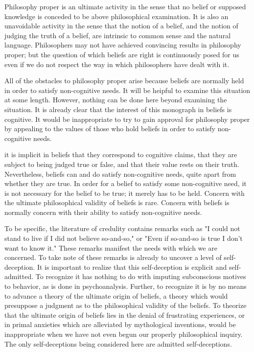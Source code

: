 \documentclass[10pt,twoside,draft]{memoir}
\begin{document}
Philosophy proper is an ultimate activity in the sense that no belief or 
supposed knowledge is conceded to be above philosophical examination. It is 
also an unavoidable activity in the sense that the notion of a belief, and the 
notion of judging the truth of a belief, are intrinsic to common sense and the 
natural language. Philosophers may not have achieved convincing results in 
philosophy proper; but the question of which beliefs are right is 
continuously posed for us even if we do not respect the way in which 
philosophers have dealt with it. 

All of the obstacles to philosophy proper arise because beliefs are 
normally held in order to satisfy non-cognitive needs. It will be heipful to 
examine this situation at some length. However, nothing can be done here 
beyond examining the situation. It is already clear that the interest of this 
monograph in beliefs is cognitive. It would be inappropriate to try to gain 
approval for philosophy proper by appealing to the values of those who hold 
beliefs in order to satisfy non-cognitive needs. 

it is implicit in beliefs that they correspond to cognitive claims, that 
they are subject to being judged true or false, and that their value rests on 
their truth. Nevertheless, beliefs can and do satisfy non-cognitive needs, 
quite apart from whether they are true. In order for a belief to satisfy some 
non-cognitive need, it is not necessary for the belief to be true; it merely has 
to be held. Concern with the ultimate philosophical validity of beliefs is rare. 
Concern with beliefs is normally concern with their ability to satisfy 
non-cognitive needs. 

To be specific, the literature of credulity contains remarks such as "I
could not stand to live if I did not believe so-and-so," or "Even if so-and-so is 
true I don't want to know it." These remarks manifest the needs with which 
we are concerned. To take note of these remarks is already to uncover a level 
of self-deception. It is important to realize that this self-deception is explicit 
and self-admitted. To recognize it has nothing to do with imputing 
subconscious motives to behavior, as is done in psychoanalysis. Further, to 
recognize it is by no means to advance a theory of the ultimate origin of 
beliefs, a theory which would presuppose a judgment as to the philosophical 
validity of the beliefs. To theorize that the ultimate origin of beliefs lies in 
the denial of frustrating experiences, or in primal anxieties which are 
alleviated by mythological inventions, would be inappropriate when we have 
not even begun our properly philosophical inquiry. The only self-deceptions 
being considered here are admitted self-deceptions. 
\end{document}
